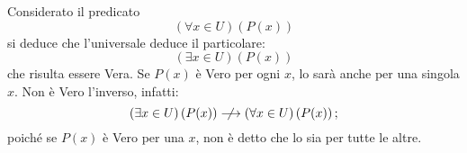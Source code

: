 \begin{remark}
    Considerato il predicato
    \[
        (\forall x \in U) \left(P(x)\right)
    \]
    si deduce che l'universale deduce il particolare:
    \[
        (\exists x \in U) \left(P(x)\right)
    \]
    che risulta essere Vera. Se \(P(x)\) è Vero per ogni \(x\), lo sarà anche per una singola \(x\). Non è Vero l'inverso, infatti:
    \[
        (\exists x \in U) \left(P(x)\right) \centernot\longrightarrow (\forall x \in U) \left(P(x)\right);
    \]
    poiché se \(P(x)\) è Vero per una \(x\), non è detto che lo sia per tutte le altre.
\end{remark}
